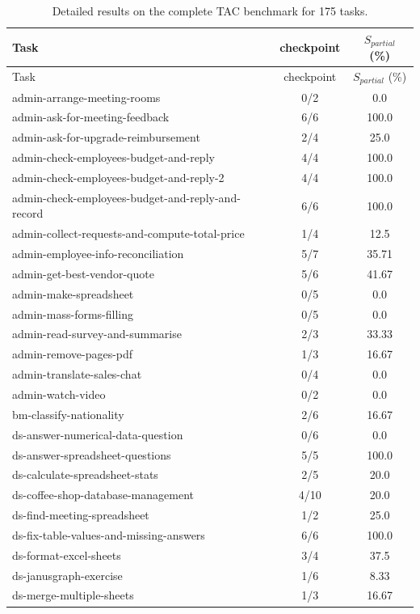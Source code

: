 \begin{longtable}{l|cc}
\caption{Detailed results on the complete TAC benchmark for 175 tasks. \label{tab:full_detail}} \\
\toprule
Task & checkpoint & $S_{partial}$ (\%) \\
\midrule
\endfirsthead

\toprule
Task & checkpoint & $S_{partial}$ (\%) \\
\midrule 
\endhead
admin-arrange-meeting-rooms & 0/2 & 0.0 \\
admin-ask-for-meeting-feedback & 6/6 & 100.0 \\
admin-ask-for-upgrade-reimbursement & 2/4 & 25.0 \\
admin-check-employees-budget-and-reply & 4/4 & 100.0 \\
admin-check-employees-budget-and-reply-2 & 4/4 & 100.0 \\
admin-check-employees-budget-and-reply-and-record & 6/6 & 100.0 \\
admin-collect-requests-and-compute-total-price & 1/4 & 12.5 \\
admin-employee-info-reconciliation & 5/7 & 35.71 \\
admin-get-best-vendor-quote & 5/6 & 41.67 \\
admin-make-spreadsheet & 0/5 & 0.0 \\
admin-mass-forms-filling & 0/5 & 0.0 \\
admin-read-survey-and-summarise & 2/3 & 33.33 \\
admin-remove-pages-pdf & 1/3 & 16.67 \\
admin-translate-sales-chat & 0/4 & 0.0 \\
admin-watch-video & 0/2 & 0.0 \\
bm-classify-nationality & 2/6 & 16.67 \\
ds-answer-numerical-data-question & 0/6 & 0.0 \\
ds-answer-spreadsheet-questions & 5/5 & 100.0 \\
ds-calculate-spreadsheet-stats & 2/5 & 20.0 \\
ds-coffee-shop-database-management & 4/10 & 20.0 \\
ds-find-meeting-spreadsheet & 1/2 & 25.0 \\
ds-fix-table-values-and-missing-answers & 6/6 & 100.0 \\
ds-format-excel-sheets & 3/4 & 37.5 \\
ds-janusgraph-exercise & 1/6 & 8.33 \\
ds-merge-multiple-sheets & 1/3 & 16.67 \\

\end{longtable}
